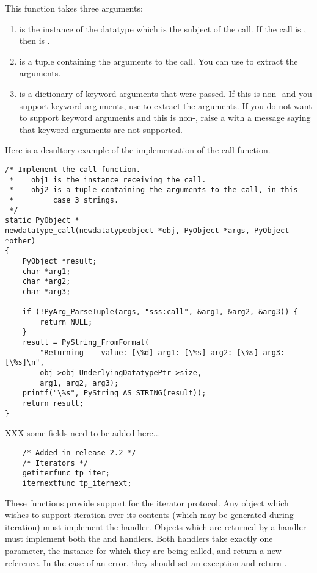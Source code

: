 This function takes three arguments:

\begin{enumerate}
  \item
     is the instance of the datatype which is the subject of
    the call. If the call is , then  is
    .

  \item
     is a tuple containing the arguments to the call.  You
    can use  to extract the arguments.

  \item
     is a dictionary of keyword arguments that were passed.
    If this is non-\NULL{} and you support keyword arguments, use
     to extract the
    arguments.  If you do not want to support keyword arguments and
    this is non-\NULL, raise a  with a message
    saying that keyword arguments are not supported.
\end{enumerate}
       
Here is a desultory example of the implementation of the call function.

\begin{verbatim}
/* Implement the call function.
 *    obj1 is the instance receiving the call.
 *    obj2 is a tuple containing the arguments to the call, in this
 *         case 3 strings.
 */
static PyObject *
newdatatype_call(newdatatypeobject *obj, PyObject *args, PyObject *other)
{
    PyObject *result;
    char *arg1;
    char *arg2;
    char *arg3;

    if (!PyArg_ParseTuple(args, "sss:call", &arg1, &arg2, &arg3)) {
        return NULL;
    }
    result = PyString_FromFormat(
        "Returning -- value: [\%d] arg1: [\%s] arg2: [\%s] arg3: [\%s]\n",
        obj->obj_UnderlyingDatatypePtr->size,
        arg1, arg2, arg3);
    printf("\%s", PyString_AS_STRING(result));
    return result;
}
\end{verbatim}

XXX some fields need to be added here...


\begin{verbatim}
    /* Added in release 2.2 */
    /* Iterators */
    getiterfunc tp_iter;
    iternextfunc tp_iternext;
\end{verbatim}

These functions provide support for the iterator protocol.  Any object
which wishes to support iteration over its contents (which may be
generated during iteration) must implement the 
handler.  Objects which are returned by a  handler must
implement both the  and  handlers.
Both handlers take exactly one parameter, the instance for which they
are being called, and return a new reference.  In the case of an
error, they should set an exception and return \NULL.

